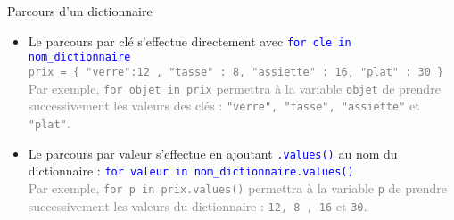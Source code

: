 \documentclass[10pt]{beamer}
\begin{document}
\begin{frame}{\Ctitle}{\stitle}
	\begin{alertblock}{Parcours d'un dictionnaire}
		\begin{itemize}
			\item<1-> Le parcours par clé s'effectue directement avec \textcolor{blue}{\tt for cle in nom\_dictionnaire}\\
			      \onslide<2->\textcolor{gray}{{\tt prix = \{ "verre":12 , "tasse" : 8, "assiette" : 16, "plat" : 30 \} } \\
			      Par exemple, {\tt for objet in prix} permettra à la variable {\tt objet} de prendre successivement les valeurs des clés : {\tt "verre", "tasse", "assiette"} et {\tt "plat"}.}
			\item<3-> Le parcours par valeur s'effectue en ajoutant \textcolor{blue}{\tt .values()} au nom du dictionnaire : \textcolor{blue}{\tt for valeur in nom\_dictionnaire.values() \\}
			      \onslide<4->\textcolor{gray}{
			      Par exemple, {\tt for p in prix.values()} permettra à la variable {\tt p} de prendre successivement les valeurs du dictionnaire : {\tt 12, 8 , 16} et {\tt 30}.
			      }
		\end{itemize}
	\end{alertblock}
\end{frame}
\end{document}
